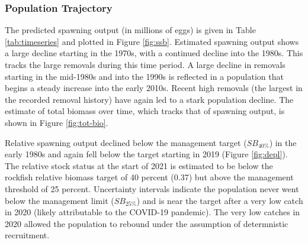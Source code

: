 \documentclass[11pt,
  english,
  a4paper,
]{article}
\begin{document}
\leavevmode\tagmcend\tagstructend\par


\hypertarget{population-trajectory}{%
\subsubsection{Population Trajectory}\label{population-trajectory}}

\leavevmode\tagmcend\tagstructend


The predicted spawning output (in millions of eggs) is given in Table \ref{tab:timeseries} and plotted in Figure \ref{fig:ssb}. Estimated spawning output shows a large decline starting in the 1970s, with a continued decline into the 1980s. This tracks the large removals during this time period. A large decline in removals starting in the mid-1980s and into the 1990s is reflected in a population that begins a steady increase into the early 2010s. Recent high removals (the largest in the recorded removal history) have again led to a stark population decline. The estimate of total biomass over time, which tracks that of spawning output, is shown in Figure \ref{fig:tot-bio}.

\leavevmode\tagmcend\tagstructend\par


Relative spawning output declined below the management target ({\(SB_{40\%}\)\leavevmode\tagmcend\tagstructend}) in the early 1980s and again fell below the target starting in 2019 (Figure \ref{fig:depl}). The relative stock status at the start of 2021 is estimated to be below the rockfish relative biomass target of 40 percent (0.37) but above the management threshold of 25 percent. Uncertainty intervals indicate the population never went below the management limit ({\(SB_{25\%}\)\leavevmode\tagmcend\tagstructend}) and is near the target after a very low catch in 2020 (likely attributable to the COVID-19 pandemic). The very low catches in 2020 allowed the population to rebound under the assumption of determnistic recruitment.

\leavevmode\tagmcend\tagstructend\par

\end{document}
